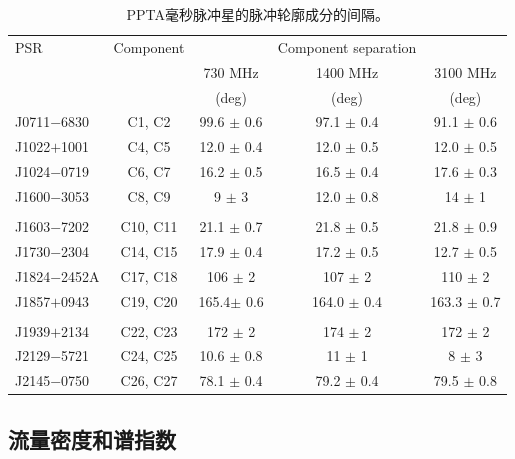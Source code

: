 \begin{table}
\begin{center}
\caption{PPTA毫秒脉冲星的脉冲轮廓成分的间隔。}
\label{separation}
\begin{tabular}{lcccc}
\hline
PSR              & Component        &         & Component separation &      \\
								 &                  & 730 MHz & 1400 MHz             & 3100 MHz \\
								 &                  &  (deg)  & (deg)                &   (deg)  \\
\hline
J0711$-$6830     &  C1, C2          &99.6  $\pm$ 0.6  & 97.1  $\pm$ 0.4 & 91.1 $\pm$ 0.6  \\
J1022$+$1001     &  C4, C5          &12.0  $\pm$ 0.4  & 12.0  $\pm$ 0.5 & 12.0 $\pm$ 0.5  \\
J1024$-$0719     &  C6, C7          &16.2  $\pm$ 0.5  & 16.5  $\pm$ 0.4 & 17.6 $\pm$ 0.3  \\
J1600$-$3053     &  C8, C9          & 9    $\pm$ 3    & 12.0  $\pm$ 0.8 &  14  $\pm$ 1    \\
	               &                  &                 &                 &                 \\
J1603$-$7202     &  C10, C11        &21.1  $\pm$ 0.7  & 21.8  $\pm$ 0.5 & 21.8 $\pm$ 0.9  \\
J1730$-$2304     &  C14, C15        &17.9  $\pm$ 0.4  & 17.2  $\pm$ 0.5 & 12.7 $\pm$ 0.5  \\
J1824$-$2452A    &  C17, C18        &  106 $\pm$ 2    &  107  $\pm$ 2   & 110  $\pm$ 2    \\
J1857$+$0943     &  C19, C20        & 165.4$\pm$ 0.6  & 164.0 $\pm$ 0.4 &163.3 $\pm$ 0.7  \\
	               &                  &                 &                 &                 \\
J1939$+$2134     &  C22, C23        & 172  $\pm$ 2    & 174   $\pm$ 2   &  172 $\pm$ 2    \\
J2129$-$5721     &  C24, C25        & 10.6 $\pm$ 0.8  &   11  $\pm$ 1   &   8  $\pm$ 3    \\
J2145$-$0750     &  C26, C27        & 78.1 $\pm$ 0.4  & 79.2  $\pm$ 0.4 &79.5  $\pm$ 0.8  \\ 
\hline
\end{tabular}
\end{center}
\end{table}

\subsection{流量密度和谱指数}

